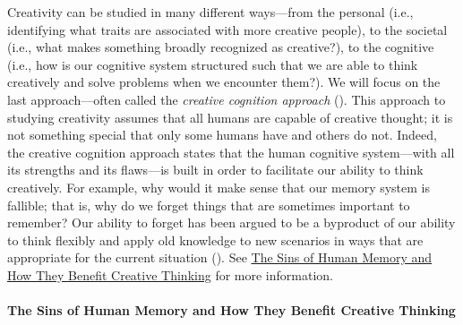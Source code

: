 \documentclass[
]{krantz}
\begin{document}
Creativity can be studied in many different ways---from the personal (i.e., identifying what traits are associated with more creative people), to the societal (i.e., what makes something broadly recognized as creative?), to the cognitive (i.e., how is our cognitive system structured such that we are able to think creatively and solve problems when we encounter them?). We will focus on the last approach---often called the \emph{creative cognition approach} (). This approach to studying creativity assumes that all humans are capable of creative thought; it is not something special that only some humans have and others do not. Indeed, the creative cognition approach states that the human cognitive system---with all its strengths and its flaws---is built in order to facilitate our ability to think creatively. For example, why would it make sense that our memory system is fallible; that is, why do we forget things that are sometimes important to remember? Our ability to forget has been argued to be a byproduct of our ability to think flexibly and apply old knowledge to new scenarios in ways that are appropriate for the current situation (). See \hyperref[the-sins-of-human-memory-and-how-they-benefit-creative-thinking]{The Sins of Human Memory and How They Benefit Creative Thinking} for more information.

\paragraph*{The Sins of Human Memory and How They Benefit Creative Thinking}\label{the-sins-of-human-memory-and-how-they-benefit-creative-thinking}
\end{document}
